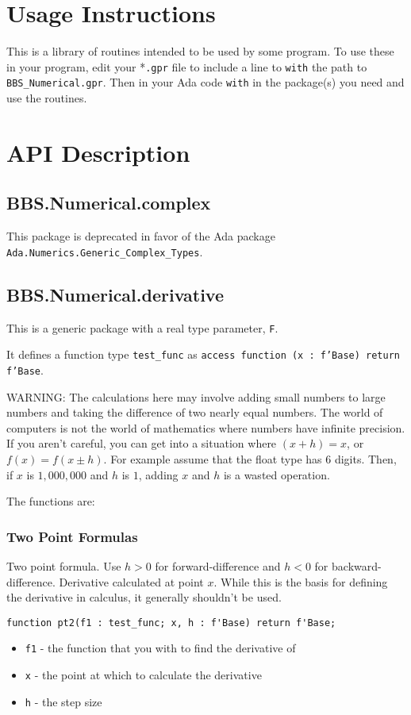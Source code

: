 \documentclass[10pt, openany]{book}
\newcommand{\package}[1]{\texttt{#1}}
\newcommand{\function}[1]{\texttt{#1}}
\newcommand{\keyword}[1]{\texttt{#1}}
\newcommand{\datatype}[1]{\texttt{#1}}
\begin{document}
\chapter{Usage Instructions}
This is a library of routines intended to be used by some program.  To use these in your program, edit your *\keyword{.gpr} file to include a line to \keyword{with} the path to \keyword{BBS\_Numerical.gpr}.  Then in your Ada code \keyword{with} in the package(s) you need and use the routines.

\chapter{API Description}
\section{BBS.Numerical.complex}
This package is deprecated in favor of the Ada package \package{Ada.Numerics.Generic\_Complex\_Types}.

\section{BBS.Numerical.derivative}
This is a generic package with a real type parameter, \datatype{F}.

It defines a function type \datatype{test\_func} as \datatype{access function (x : f'Base) return f'Base}.

WARNING:
The calculations here may involve adding small numbers to large numbers and taking the difference of two nearly equal numbers.
The world of computers is not the world of mathematics where numbers have infinite precision.  If you aren't careful, you can get into a situation where $(x + h) = x$, or $f(x) = f(x \pm h)$. For example assume that the float type has 6 digits.  Then, if $x$ is $1,000,000$ and $h$ is $1$, adding $x$ and $h$ is a wasted operation.

The functions are:
\subsection{Two Point Formulas}
Two point formula.  Use $h>0$ for forward-difference and $h<0$ for backward-difference.  Derivative calculated at point $x$.  While this is the basis for defining the derivative in calculus, it generally shouldn't be used.
\begin{lstlisting}
function pt2(f1 : test_func; x, h : f'Base) return f'Base;
\end{lstlisting}
\begin{itemize}
  \item \function{f1} - the function that you with to find the derivative of
  \item \function{x} - the point at which to calculate the derivative
  \item \function{h} - the step size
\end{itemize}
\end{document}

